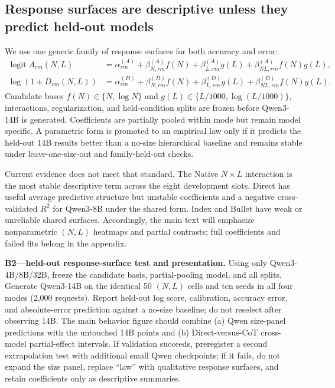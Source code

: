 \subsection{Response surfaces are descriptive unless they predict held-out models}

We use one generic family of response surfaces for both accuracy and error:
\begin{align}
\operatorname{logit} A_{rm}(N,L)
  &=\alpha^{(A)}_{rm}
    +\beta^{(A)}_{N,rm}f(N)
    +\beta^{(A)}_{L,rm}g(L)
    +\beta^{(A)}_{NL,rm}f(N)g(L),\\
\log\!\left(1+D_{rm}(N,L)\right)
  &=\alpha^{(D)}_{rm}
    +\beta^{(D)}_{N,rm}f(N)
    +\beta^{(D)}_{L,rm}g(L)
    +\beta^{(D)}_{NL,rm}f(N)g(L).
\label{eq:response-surface}
\end{align}
Candidate bases \(f(N)\in\{N,\log N\}\) and \(g(L)\in\{L/1000,\log(L/1000)\}\), interactions, regularization, and held-condition splits are frozen before Qwen3-14B is generated. Coefficients are partially pooled within mode but remain model specific. A parametric form is promoted to an empirical law only if it predicts the held-out 14B results better than a no-size hierarchical baseline and remains stable under leave-one-size-out and family-held-out checks.

Current evidence does not meet that standard. The Native \(N\times L\) interaction is the most stable descriptive term across the eight development slots. Direct has useful average predictive structure but unstable coefficients and a negative cross-validated \(R^2\) for Qwen3-8B under the shared form. Index and Bullet have weak or unreliable shared surfaces. Accordingly, the main text will emphasize nonparametric \((N,L)\) heatmaps and partial contrasts; full coefficients and failed fits belong in the appendix.

\begin{todobox}
\textbf{B2---held-out response-surface test and presentation.}
Using only Qwen3-4B/8B/32B, freeze the candidate basis, partial-pooling model, and all splits. Generate Qwen3-14B on the identical 50 \((N,L)\) cells and ten seeds in all four modes (2,000 requests). Report held-out log score, calibration, accuracy error, and absolute-error prediction against a no-size baseline; do not reselect after observing 14B. The main behavior figure should combine (a) Qwen size-panel predictions with the untouched 14B points and (b) Direct-versus-CoT cross-model partial-effect intervals. If validation succeeds, preregister a second extrapolation test with additional small Qwen checkpoints; if it fails, do not expand the size panel, replace ``law'' with qualitative response surfaces, and retain coefficients only as descriptive summaries.
\end{todobox}

